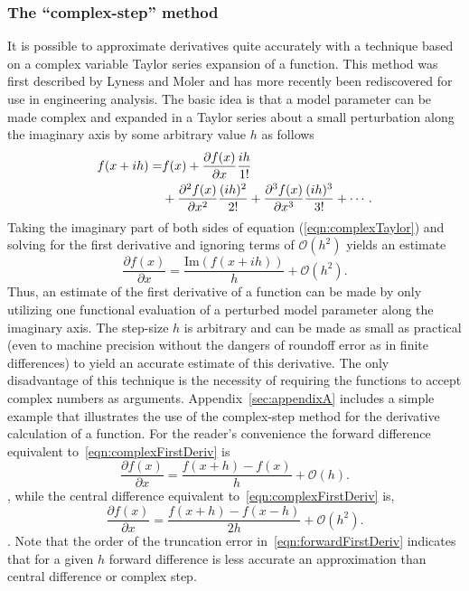 \documentclass[preprint,12pt]{elsarticle}
\begin{document}
\subsubsection{The ``complex-step'' method}  
\label{sec:CSmethod} 

It is
possible to approximate derivatives quite accurately with a technique based on
a complex variable Taylor series expansion of a function.  This method was
first described by Lyness and Moler
\cite{lyness1967numerical,lyness1968differentiation} and has more recently been
rediscovered for use in engineering analysis.  The basic idea is that a model parameter can
be made complex and expanded in a Taylor series about a small perturbation
along the imaginary axis by some arbitrary value $h$ as follows
%
\begin{align} f ( x + i h ) =& f(x) + \frac{\partial f(x)}{\partial x} \frac{i
h}{1!}  \notag \\ &+ \frac{\partial^2 f(x)}{\partial x^2} \frac{(i h)^2}{2!} +
\frac{\partial^3 f(x)}{\partial x^3} \frac{(i h)^3}{3!} + \cdots.
\label{eqn:complexTaylor} \end{align}
%
Taking the imaginary part of both sides of equation (\ref{eqn:complexTaylor})
and solving for the first derivative and ignoring terms of $\mathcal{O}\left(
h^2 \right)$ yields an estimate
%
\begin{equation} \frac{\partial f( x )}{\partial x} = \frac{\mbox{Im}
\left( f (x + i h) \right)}{h} +\mathcal{O}\left( h^2 \right).  \label{eqn:complexFirstDeriv} \end{equation}
%
Thus, an estimate of the first derivative of a function can be made by only
utilizing one functional evaluation of a perturbed model parameter along the
imaginary axis.  The step-size $h$ is arbitrary and can be made as small as
practical (even to machine precision without the dangers of roundoff error as
in finite differences) to yield an accurate estimate of this derivative.  The
only disadvantage of this technique is the necessity of requiring the functions
to accept complex numbers as arguments. Appendix~\ref{sec:appendixA} includes a
simple example that illustrates the use of the complex-step method for the
derivative calculation of a function. 
%
For the reader's convenience the forward difference equivalent to~\ref{eqn:complexFirstDeriv} is
%
\begin{equation} \frac{\partial f( x )}{\partial x} = \frac{f (x + h) - f (x)}{h} +\mathcal{O}\left( h \right). \label{eqn:forwardFirstDeriv} \end{equation},
%
while the central difference equivalent to~\ref{eqn:complexFirstDeriv} is,
%
\begin{equation} \frac{\partial f( x )}{\partial x} = \frac{f (x + h) - f (x - h)}{2h} +\mathcal{O}\left( h^2 \right). \label{eqn:centeredFirstDeriv} \end{equation} \cite[Chap. 4.1.3]{chapra2010}.
%
Note that the order of the truncation error in~\ref{eqn:forwardFirstDeriv} indicates that for a given $h$ forward difference is less accurate an approximation than central difference or complex step.
\end{document}
